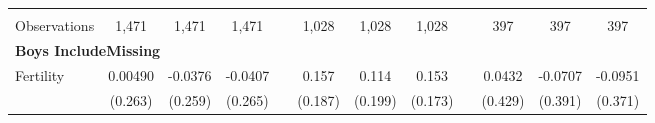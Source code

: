 \begin{landscape}
\begin{table}[htpb!]
\begin{center}
\begin{tabular}{lcccp{2mm}cccp{2mm}ccc}
\begin{footnotesize}\end{footnotesize}&\begin{footnotesize}\end{footnotesize}&\begin{footnotesize}\end{footnotesize}&\begin{footnotesize}\end{footnotesize}&\begin{footnotesize}\end{footnotesize}&\begin{footnotesize}\end{footnotesize}&\begin{footnotesize}\end{footnotesize}&\begin{footnotesize}\end{footnotesize}&\begin{footnotesize}\end{footnotesize}&\begin{footnotesize}\end{footnotesize}&\begin{footnotesize}\end{footnotesize}&\begin{footnotesize}\end{footnotesize}\\Observations&1,471&1,471&1,471&&1,028&1,028&1,028&&397&397&397\\
\multicolumn{12}{l}{\textbf{Boys IncludeMissing}}\\ 
Fertility&0.00490&-0.0376&-0.0407&&0.157&0.114&0.153&&0.0432&-0.0707&-0.0951\\
&(0.263)&(0.259)&(0.265)&&(0.187)&(0.199)&(0.173)&&(0.429)&(0.391)&(0.371)\\

\end{tabular}
\end{center}
\end{table}
\end{landscape}
